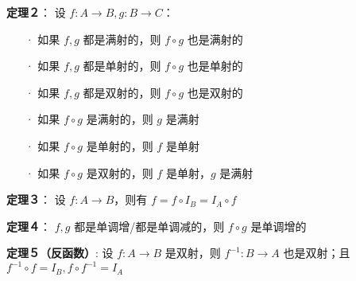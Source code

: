 	\textbf{定理２}：
	设 $f: A \rightarrow B, g: B \rightarrow C$：
	\begin{itemize}
		\item[·] 如果 $f,g$ 都是满射的，则 $f \circ g$ 也是满射的
		\item[·] 如果 $f,g$ 都是单射的，则 $f \circ g$ 也是单射的
		\item[·] 如果 $f,g$ 都是双射的，则 $f \circ g$ 也是双射的
		\item[·] 如果 $f \circ g$ 是满射的，则 $g$ 是满射
		\item[·] 如果 $f \circ g$ 是单射的，则 $f$ 是单射
		\item[·] 如果 $f \circ g$ 是双射的，则 $f$ 是单射，$g$ 是满射
	\end{itemize}
	
	\textbf{定理３}：
	设 $f: A \rightarrow B$，则有 $f = f \circ I_B = I_A \circ f$
	
	\textbf{定理４}：
	$f, g$ 都是单调增/都是单调减的，则 $f \circ g$ 是单调增的
	
	\textbf{定理５（反函数）}:
	设 $f: A \rightarrow B$ 是双射，则 $f^{-1}: B \rightarrow A$ 也是双射；且 $f^{-1} \circ f = I_B, f \circ f^{-1} = I_A$